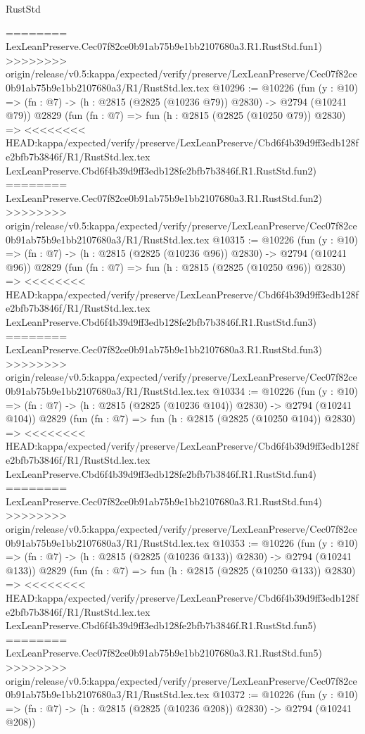 \begin{lexlean}{RustStd}
\begin{coremodule}
{\begin{coremodule}
{{{{{{{{{{{{{{{========
    LexLeanPreserve.Cec07f82ce0b91ab75b9e1bb2107680a3.R1.RustStd.fun1)
>>>>>>>> origin/release/v0.5:kappa/expected/verify/preserve/LexLeanPreserve/Cec07f82ce0b91ab75b9e1bb2107680a3/R1/RustStd.lex.tex
@10296 := @10226
    (fun (y : @10) => (fn : @7) -> (h : @2815 (@2825 (@10236 @79)) @2830) -> @2794 (@10241 @79))
    @2829
    (fun (fn : @7) =>
    fun (h : @2815 (@2825 (@10250 @79)) @2830) =>
<<<<<<<< HEAD:kappa/expected/verify/preserve/LexLeanPreserve/Cbd6f4b39d9ff3edb128fe2bfb7b3846f/R1/RustStd.lex.tex
    LexLeanPreserve.Cbd6f4b39d9ff3edb128fe2bfb7b3846f.R1.RustStd.fun2)
========
    LexLeanPreserve.Cec07f82ce0b91ab75b9e1bb2107680a3.R1.RustStd.fun2)
>>>>>>>> origin/release/v0.5:kappa/expected/verify/preserve/LexLeanPreserve/Cec07f82ce0b91ab75b9e1bb2107680a3/R1/RustStd.lex.tex
@10315 := @10226
    (fun (y : @10) => (fn : @7) -> (h : @2815 (@2825 (@10236 @96)) @2830) -> @2794 (@10241 @96))
    @2829
    (fun (fn : @7) =>
    fun (h : @2815 (@2825 (@10250 @96)) @2830) =>
<<<<<<<< HEAD:kappa/expected/verify/preserve/LexLeanPreserve/Cbd6f4b39d9ff3edb128fe2bfb7b3846f/R1/RustStd.lex.tex
    LexLeanPreserve.Cbd6f4b39d9ff3edb128fe2bfb7b3846f.R1.RustStd.fun3)
========
    LexLeanPreserve.Cec07f82ce0b91ab75b9e1bb2107680a3.R1.RustStd.fun3)
>>>>>>>> origin/release/v0.5:kappa/expected/verify/preserve/LexLeanPreserve/Cec07f82ce0b91ab75b9e1bb2107680a3/R1/RustStd.lex.tex
@10334 := @10226
    (fun (y : @10) => (fn : @7) -> (h : @2815 (@2825 (@10236 @104)) @2830) -> @2794 (@10241 @104))
    @2829
    (fun (fn : @7) =>
    fun (h : @2815 (@2825 (@10250 @104)) @2830) =>
<<<<<<<< HEAD:kappa/expected/verify/preserve/LexLeanPreserve/Cbd6f4b39d9ff3edb128fe2bfb7b3846f/R1/RustStd.lex.tex
    LexLeanPreserve.Cbd6f4b39d9ff3edb128fe2bfb7b3846f.R1.RustStd.fun4)
========
    LexLeanPreserve.Cec07f82ce0b91ab75b9e1bb2107680a3.R1.RustStd.fun4)
>>>>>>>> origin/release/v0.5:kappa/expected/verify/preserve/LexLeanPreserve/Cec07f82ce0b91ab75b9e1bb2107680a3/R1/RustStd.lex.tex
@10353 := @10226
    (fun (y : @10) => (fn : @7) -> (h : @2815 (@2825 (@10236 @133)) @2830) -> @2794 (@10241 @133))
    @2829
    (fun (fn : @7) =>
    fun (h : @2815 (@2825 (@10250 @133)) @2830) =>
<<<<<<<< HEAD:kappa/expected/verify/preserve/LexLeanPreserve/Cbd6f4b39d9ff3edb128fe2bfb7b3846f/R1/RustStd.lex.tex
    LexLeanPreserve.Cbd6f4b39d9ff3edb128fe2bfb7b3846f.R1.RustStd.fun5)
========
    LexLeanPreserve.Cec07f82ce0b91ab75b9e1bb2107680a3.R1.RustStd.fun5)
>>>>>>>> origin/release/v0.5:kappa/expected/verify/preserve/LexLeanPreserve/Cec07f82ce0b91ab75b9e1bb2107680a3/R1/RustStd.lex.tex
@10372 := @10226
    (fun (y : @10) => (fn : @7) -> (h : @2815 (@2825 (@10236 @208)) @2830) -> @2794 (@10241 @208))
}}}}}}}}}}}}}}}
\end{coremodule}}
\end{coremodule}
\end{lexlean}
